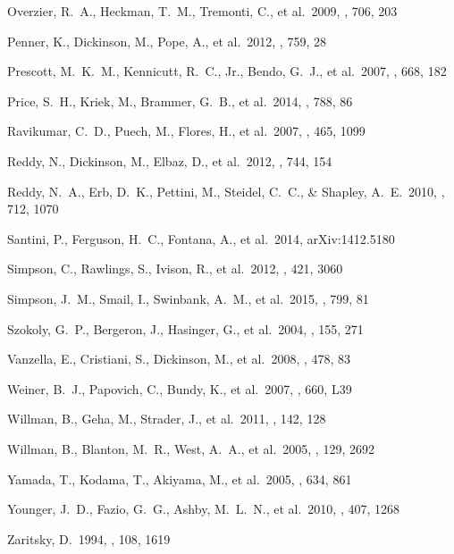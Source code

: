 \documentclass[preprint]{aastex}
\begin{document}
\begin{thebibliography}
 Overzier, R.~A., 
Heckman, T.~M., Tremonti, C., et al.\ 2009, \apj, 706, 203

 Penner, K., Dickinson, 
M., Pope, A., et al.\ 2012, \apj, 759, 28 

 Prescott, M.~K.~M., 
Kennicutt, R.~C., Jr., Bendo, G.~J., et al.\ 2007, \apj, 668, 182

 Price, S.~H., Kriek, M., 
Brammer, G.~B., et al.\ 2014, \apj, 788, 86

 Ravikumar, C.~D., Puech, M.,
Flores, H., et al.\ 2007, \aap, 465, 1099

 Reddy, N., Dickinson, M.,
Elbaz, D., et al.\ 2012, \apj, 744, 154 

 Reddy, N.~A., Erb, D.~K.,
Pettini, M., Steidel, C.~C., \& Shapley, A.~E.\ 2010, \apj, 712, 1070

 Santini, P., Ferguson, 
H.~C., Fontana, A., et al.\ 2014, arXiv:1412.5180

 Simpson, C., Rawlings, 
S., Ivison, R., et al.\ 2012, \mnras, 421, 3060

 Simpson, J.~M., Smail, 
I., Swinbank, A.~M., et al.\ 2015, \apj, 799, 81

 Szokoly, G.~P., 
Bergeron, J., Hasinger, G., et al.\ 2004, \apjs, 155, 271

 Vanzella, E., Cristiani, S.,
Dickinson, M., et al.\ 2008, \aap, 478, 83

 Weiner, B.~J., Papovich, 
C., Bundy, K., et al.\ 2007, \apjl, 660, L39

 Willman, B., Geha, M., 
Strader, J., et al.\ 2011, \aj, 142, 128 

 Willman, B., Blanton, 
M.~R., West, A.~A., et al.\ 2005, \aj, 129, 2692

 Yamada, T., Kodama, T., 
Akiyama, M., et al.\ 2005, \apj, 634, 861

 Younger, J.~D., Fazio, 
G.~G., Ashby, M.~L.~N., et al.\ 2010, \mnras, 407, 1268

 Zaritsky, D.\ 1994, \aj, 108, 
1619

\end{thebibliography}
\end{document}
